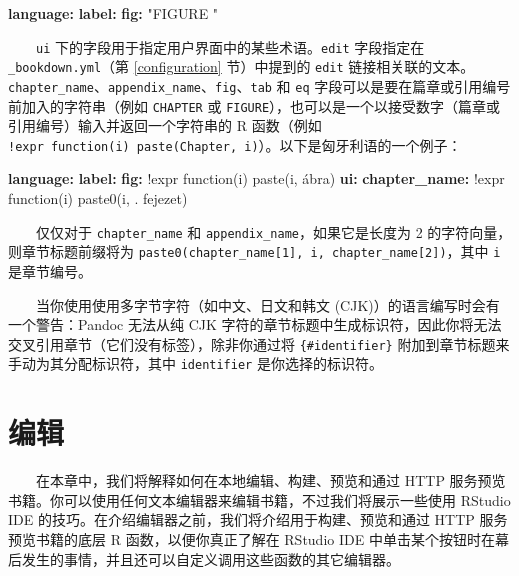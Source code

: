 \documentclass[
  12pt,
]{krantz}
\newenvironment{Shaded}{\begin{snugshade}}{\end{snugshade}}
\newcommand{\AttributeTok}[1]{\textcolor[rgb]{0.13,0.29,0.53}{#1}}
\newcommand{\FunctionTok}[1]{\textcolor[rgb]{0.13,0.29,0.53}{\textbf{#1}}}
\newcommand{\KeywordTok}[1]{\textcolor[rgb]{0.13,0.29,0.53}{\textbf{#1}}}
\newcommand{\StringTok}[1]{\textcolor[rgb]{0.31,0.60,0.02}{#1}}
\theoremstyle{definition}
\theoremstyle{definition}
\theoremstyle{definition}
\theoremstyle{definition}
\theoremstyle{remark}
\begin{document}
\begin{Shaded}
\begin{Highlighting}[]
\FunctionTok{language}\KeywordTok{:}
\AttributeTok{  }\FunctionTok{label}\KeywordTok{:}
\AttributeTok{    }\FunctionTok{fig}\KeywordTok{:}\AttributeTok{ }\StringTok{"FIGURE "}
\end{Highlighting}
\end{Shaded}

  \texttt{ui} 下的字段用于指定用户界面中的某些术语。\texttt{edit} 字段指定在 \texttt{\_bookdown.yml}（第 \ref{configuration} 节）中提到的 \texttt{edit} 链接相关联的文本。\texttt{chapter\_name}、\texttt{appendix\_name}、\texttt{fig}、\texttt{tab} 和 \texttt{eq} 字段可以是要在篇章或引用编号前加入的字符串（例如 \texttt{CHAPTER} 或 \texttt{FIGURE}），也可以是一个以接受数字（篇章或引用编号）输入并返回一个字符串的 R 函数（例如 \texttt{!expr\ function(i)\ paste(\textquotesingle{}Chapter\textquotesingle{},\ i)}）。以下是匈牙利语的一个例子：

\begin{Shaded}
\begin{Highlighting}[]
\FunctionTok{language}\KeywordTok{:}
\AttributeTok{  }\FunctionTok{label}\KeywordTok{:}
\AttributeTok{    }\FunctionTok{fig}\KeywordTok{:}\AttributeTok{ !expr function(i) paste(i, \textquotesingle{}ábra\textquotesingle{})}
\AttributeTok{  }\FunctionTok{ui}\KeywordTok{:}
\AttributeTok{    }\FunctionTok{chapter\_name}\KeywordTok{:}\AttributeTok{ !expr function(i) paste0(i, \textquotesingle{}. fejezet\textquotesingle{})}
\end{Highlighting}
\end{Shaded}

  仅仅对于 \texttt{chapter\_name} 和 \texttt{appendix\_name}，如果它是长度为 2 的字符向量，则章节标题前缀将为 \texttt{paste0(chapter\_name{[}1{]},\ i,\ chapter\_name{[}2{]})}，其中 \texttt{i} 是章节编号。

  当你使用使用多字节字符（如中文、日文和韩文 (CJK)）的语言编写时会有一个警告：Pandoc 无法从纯 CJK 字符的章节标题中生成标识符，因此你将无法交叉引用章节（它们没有标签），除非你通过将 \texttt{\{\#identifier\}} 附加到章节标题来手动为其分配标识符，其中 \texttt{identifier} 是你选择的标识符。

\hypertarget{editing}{%
\chapter{编辑}\label{editing}}

  在本章中，我们将解释如何在本地编辑、构建、预览和通过 HTTP 服务预览书籍。你可以使用任何文本编辑器来编辑书籍，不过我们将展示一些使用 RStudio IDE 的技巧。在介绍编辑器之前，我们将介绍用于构建、预览和通过 HTTP 服务预览书籍的底层 R 函数，以便你真正了解在 RStudio IDE 中单击某个按钮时在幕后发生的事情，并且还可以自定义调用这些函数的其它编辑器。
\end{document}

